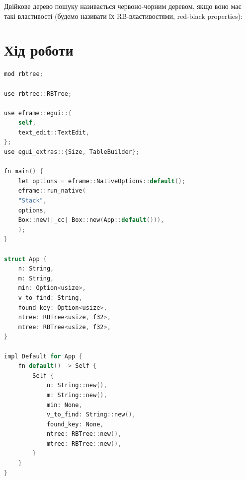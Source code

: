 \documentclass{article}
\begin{document}
\begin{normalsize}
		Двійкове дерево пошуку називається червоно-чорним деревом, якщо воно має такі властивості (будемо називати їх RB-властивостями, red-black properties): 
		
		\section*{Хід роботи}
		\begin{lstlisting}[language=C]
mod rbtree;

use rbtree::RBTree;

use eframe::egui::{
	self,
	text_edit::TextEdit,
};
use egui_extras::{Size, TableBuilder};

fn main() {
	let options = eframe::NativeOptions::default();
	eframe::run_native(
	"Stack",
	options,
	Box::new(|_cc| Box::new(App::default())),
	);
}

struct App {
	n: String,
	m: String,
	min: Option<usize>,
	v_to_find: String,
	found_key: Option<usize>,
	ntree: RBTree<usize, f32>,
	mtree: RBTree<usize, f32>,
}

impl Default for App {
	fn default() -> Self {
		Self {
			n: String::new(),
			m: String::new(),
			min: None,
			v_to_find: String::new(),
			found_key: None,
			ntree: RBTree::new(),
			mtree: RBTree::new(),
		}
	}
}


\end{lstlisting}
\end{normalsize}
\end{document}
